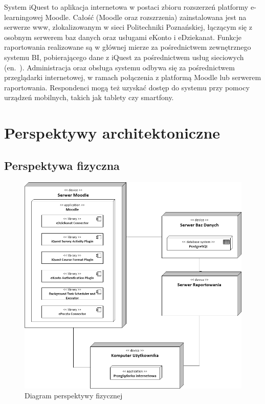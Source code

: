 System iQuest to aplikacja internetowa w postaci zbioru rozszerzeń platformy e-learningowej Moodle. Całość (Moodle oraz rozszrzenia) zainstalowana jest na serwerze www, zlokalizowanym w sieci Politechniki Poznańskiej, łączącym się z osobnym serwerem baz danych oraz usługami eKonto i eDziekanat. Funkcje raportowania realizowane są w głównej mierze za pośrednictwem zewnętrznego systemu BI, pobierającego dane z iQuest za pośrednictwem usług sieciowych (en.~). Administracja oraz obsługa systemu odbywa się za pośrednictwem przeglądarki internetowej, w ramach połączenia z platformą Moodle lub serwerem raportowania. Respondenci mogą też uzyskać dostęp do systemu przy pomocy urządzeń mobilnych, takich jak tablety czy smartfony.

%
%
\section{Perspektywy architektoniczne}
\label{Chapter53}

\subsection{Perspektywa fizyczna}
\label{Chapter531}

\begin{figure}[H]
\centering\includegraphics[width=15cm]{figures/PhysicalView}
\caption{Diagram perspektywy fizycznej}\label{rys:PerspektywaFizyczna}
\end{figure}


